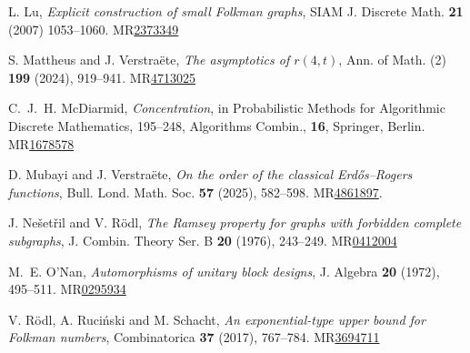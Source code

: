 \documentclass[A4paper,reqno,oneside,12pt]{amsart}
\theoremstyle{plain}
\theoremstyle{definition}
\begin{document}
\begin{thebibliography}{}
L. Lu, 
{\it Explicit construction of small Folkman graphs},
SIAM J. Discrete Math. {\bf 21} (2007) 1053--1060.
MR\href{https://mathscinet.ams.org/mathscinet/article?mr=2373349}{2373349}

S. Mattheus and J. Verstra\"ete, 
{\it The asymptotics of $r(4,t)$},
Ann. of Math. (2) {\bf 199} (2024), 919--941. MR\href{https://mathscinet.ams.org/mathscinet/article?mr=4713025}{4713025}

C.~J.~H. McDiarmid, 
{\it Concentration}, 
in Probabilistic Methods for Algorithmic Discrete Mathematics, 195--248, Algorithms Combin., {\bf 16}, Springer, Berlin.
MR\href{https://mathscinet.ams.org/mathscinet/article?mr=1678578}{1678578}

D. Mubayi and J. Verstra\"ete, 
{\it On the order of the classical Erd\H{o}s--Rogers functions},
Bull. Lond. Math. Soc. {\bf 57} (2025), 582--598.
MR\href{https://mathscinet.ams.org/mathscinet/article?mr=4861897}{4861897}.


J. Ne\v{s}et\v{r}il and V. R\"odl, 
{\it The Ramsey property for graphs with forbidden complete subgraphs},
J. Combin. Theory Ser. B {\bf 20} (1976), 243--249. MR\href{https://mathscinet.ams.org/mathscinet/article?mr=412004}{0412004}


M.~E. O'Nan, 
{\it Automorphisms of unitary block designs},
J. Algebra {\bf 20} (1972), 495--511. MR\href{https://mathscinet.ams.org/mathscinet/article?mr=295934}{0295934}



V. R\"odl, A. Ruci\'nski and M. Schacht, 
{\it An exponential-type upper bound for Folkman numbers},
Combinatorica {\bf 37} (2017), 767--784.
MR\href{https://mathscinet.ams.org/mathscinet/article?mr=3694711}{3694711}


\end{thebibliography}
\end{document}
